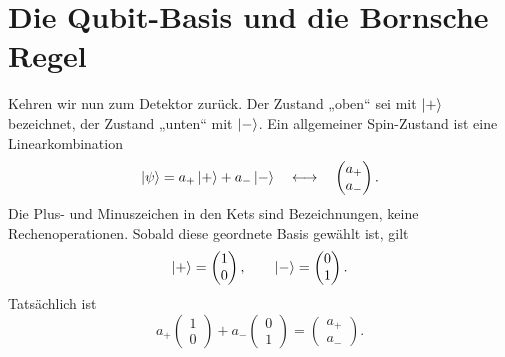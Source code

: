 \begin{classroomqa}\end{classroomqa}

\section{Die Qubit-Basis und die Bornsche Regel}

Kehren wir nun zum Detektor zurück. Der Zustand „oben“ sei mit \(\left\lvert+\right\rangle\) bezeichnet, der Zustand „unten“ mit \(\left\lvert-\right\rangle\). Ein allgemeiner Spin-Zustand ist eine Linearkombination
\begin{equation}
  \left\lvert\psi\right\rangle=a_+\left\lvert+\right\rangle+a_-\left\lvert-\right\rangle
  \quad\longleftrightarrow\quad
  \begin{pmatrix}a_+\\a_-\end{pmatrix}.
  \label{eq:l02-general-qubit}
\end{equation}
Die Plus- und Minuszeichen in den Kets sind Bezeichnungen, keine Rechenoperationen. Sobald diese geordnete Basis gewählt ist, gilt
\begin{equation}
  \left\lvert+\right\rangle=
  \begin{pmatrix}1\\0\end{pmatrix},
  \qquad
  \left\lvert-\right\rangle=
  \begin{pmatrix}0\\1\end{pmatrix}.
  \label{eq:l02-basis-columns}
\end{equation}
Tatsächlich ist
\begin{equation}
  a_+\begin{pmatrix}1\\0\end{pmatrix}
  +a_-\begin{pmatrix}0\\1\end{pmatrix}
  =
  \begin{pmatrix}a_+\\a_-\end{pmatrix}.
  \label{eq:l02-basis-expansion}
\end{equation}

